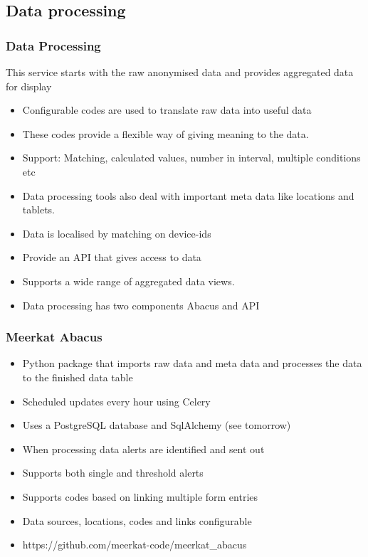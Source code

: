 \documentclass{beamer}
\begin{document}
\subsection{Data processing}
\begin{frame}
  \frametitle{Data Processing}
  This service starts with the raw anonymised data and provides aggregated data for display
  \begin{itemize}
  \item Configurable codes are used to translate raw data into useful data
  \item These codes provide a flexible way of giving meaning to the data.
  \item Support: Matching, calculated values, number in interval, multiple conditions etc
  \item Data processing tools also deal with important meta data like locations and tablets.
  \item Data is localised by matching on device-ids
  \item Provide an API that gives access to data
  \item Supports a wide range of aggregated data views.
  \item Data processing has two components Abacus and API
  \end{itemize}
\end{frame}



\begin{frame}
  \frametitle{Meerkat Abacus}
  \begin{itemize}
  \item Python package that imports raw data and meta data and processes the data to the finished data table
  \item Scheduled updates every hour using Celery
  \item Uses a PostgreSQL database and SqlAlchemy (see tomorrow)
  \item When processing data alerts are identified and sent out
  \item Supports both single and threshold alerts
  \item Supports codes based on linking multiple form entries
  \item Data sources, locations, codes and links configurable
  \item https://github.com/meerkat-code/meerkat\_abacus
  \end{itemize}

\end{frame}
\end{document}
